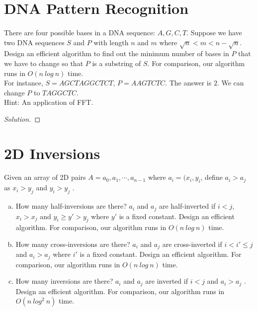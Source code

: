 \documentclass[a4paper]{article}
\newenvironment{solution}
  {\renewcommand\qedsymbol{$\blacksquare$}\begin{proof}[Solution]}
  {\end{proof}}
\begin{document}
\section*{DNA Pattern Recognition}
\paragraph{}
There are four possible bases in a DNA sequence: $A, G, C, T$. Suppose we have two DNA sequences $S$
and $P$ with length $n$ and $m$ where $\sqrt{n} < m < n − \sqrt{n}$. Design an efficient algorithm to find out the minimum
number of bases in $P$ that we have to change so that $P$ is a substring of $S$. For comparison, our algorithm
runs in $O(n\ log\ n)$ time.\\
For instance, $S =  AGCTAGGCTCT $, $P =  AAGTCTC $. The answer is $2$. We can change $P$ to
$ TAGGCTC $.\\
Hint: An application of FFT.
\begin{solution}

\end{solution}

\section*{2D Inversions}
\paragraph{}
Given an array of 2D pairs $A = a_{0},a_{1},\cdots,a_{n-1}$ where $a_{i}=(x_{i},y_{i}$, define $a_{i}>a_{j}$ as $x_{i}>y_{j}$ and
$y_{i}>y_{j}$ .
\begin{enumerate}[(a)]
  \item How many half-inversions are there? $a_{i}$ and $a_{j}$ are half-inverted if $i < j$, $x_{i} > x_{j}$ and $y_{i}\ge y' > y_{j}$
  where $y'$ is a fixed constant. Design an efficient algorithm. For comparison, our algorithm runs in $O(n\ log\ n)$
  time.
  \item How many cross-inversions are there? $a_{i}$ and $a_{j}$ are cross-inverted if $i <i'\le j$ and $a_{i}>a_{j}$ where $i'$
  is a fixed constant. Design an efficient algorithm. For comparison, our algorithm runs in $O(n\ log\ n)$ time.
  \item How many inversions are there? $a_{i}$ and $a_{j}$ are inverted if $i < j$ and $a_{i}>a_{j}$ . Design an efficient
  algorithm. For comparison, our algorithm runs in $O(n\  log^{2}\  n)$ time.
\end{enumerate}
\end{document}
